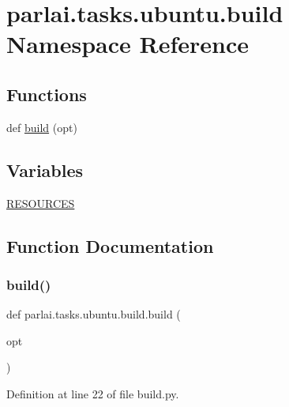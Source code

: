 \hypertarget{namespaceparlai_1_1tasks_1_1ubuntu_1_1build}{}\section{parlai.\+tasks.\+ubuntu.\+build Namespace Reference}
\label{namespaceparlai_1_1tasks_1_1ubuntu_1_1build}
\subsection*{Functions}
\begin{DoxyCompactItemize}
\item 
def \hyperlink{namespaceparlai_1_1tasks_1_1ubuntu_1_1build_aedbc80b48491ff9f08bbc5e82b9504a3}{build} (opt)
\end{DoxyCompactItemize}
\subsection*{Variables}
\begin{DoxyCompactItemize}
\item 
\hyperlink{namespaceparlai_1_1tasks_1_1ubuntu_1_1build_a98e8e58fda312364152e973761329a10}{R\+E\+S\+O\+U\+R\+C\+ES}
\end{DoxyCompactItemize}


\subsection{Function Documentation}
\mbox{\label{namespaceparlai_1_1tasks_1_1ubuntu_1_1build_aedbc80b48491ff9f08bbc5e82b9504a3}} 
\subsubsection{\texorpdfstring{build()}{build()}}
{\footnotesize\ttfamily def parlai.\+tasks.\+ubuntu.\+build.\+build (\begin{DoxyParamCaption}\item[{}]{opt }\end{DoxyParamCaption})}



Definition at line 22 of file build.\+py.


